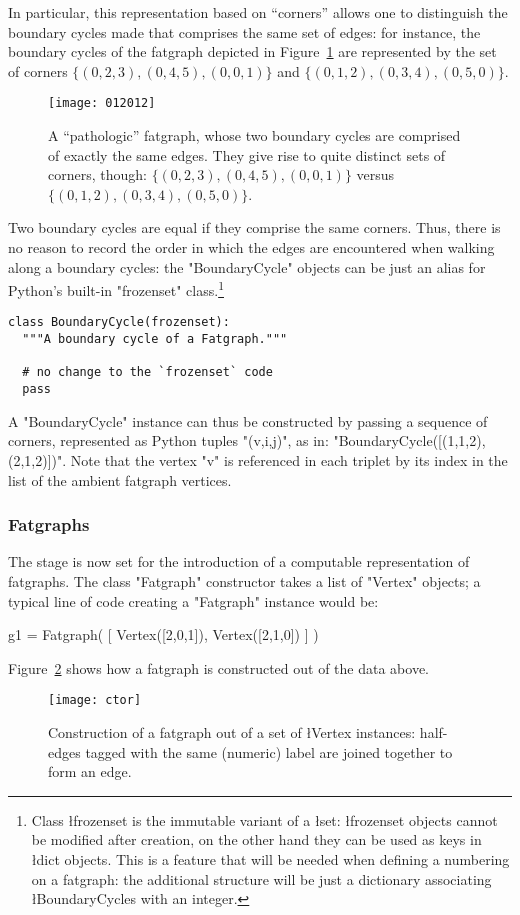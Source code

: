 In particular, this representation based on ``corners'' allows one to
distinguish the boundary cycles made that comprises the same set of
edges: for instance, the boundary cycles of the fatgraph depicted in
Figure~\ref{fig:012012} are represented by the set of corners $\{(0, 2, 3),
(0, 4, 5), (0, 0, 1)\}$ and $\{(0, 1, 2), (0, 3, 4), (0, 5, 0)\}$.
\begin{figure}
  \centering
  \texttt{[image: 012012]}
  \caption{A ``pathologic'' fatgraph, whose two boundary cycles are
    comprised of exactly the same edges. They give rise to quite
    distinct sets of corners, though: $\{(0, 2, 3), (0, 4, 5), (0, 0,
    1)\}$ versus $\{(0, 1, 2), (0, 3, 4), (0, 5, 0)\}$.}
  \label{fig:012012}
\end{figure}

Two boundary cycles are equal if they comprise the same corners.
Thus, there is no reason to record the order in which the edges are
encountered when walking along a boundary cycles: the "BoundaryCycle"
objects can be just an alias for Python's built-in "frozenset"
class.\footnote{Class \l{frozenset} is the immutable variant of a
  \l{set}: \l{frozenset} objects cannot be modified after creation, on
  the other hand they can be used as keys in \l{dict} objects.  This
  is a feature that will be needed when defining a numbering on a
  fatgraph: the additional structure will be just a dictionary
  associating \l{BoundaryCycles} with an integer.}
\begin{lstlisting}
class BoundaryCycle(frozenset):
  """A boundary cycle of a Fatgraph."""

  # no change to the `frozenset` code
  pass 

\end{lstlisting}
A "BoundaryCycle" instance can thus be constructed by passing a
sequence of corners, represented as Python tuples "(v,i,j)", as in:
"BoundaryCycle([(1,1,2), (2,1,2)])".  Note that the vertex "v" is
referenced in each triplet by its index in the list of the ambient
fatgraph vertices.


\subsubsection{Fatgraphs}
\label{sec:fatgraphs}

The stage is now set for the introduction of a computable
representation of fatgraphs.  The class "Fatgraph" constructor takes a
list of "Vertex" objects; a typical line of code creating a "Fatgraph"
instance would be:
\begin{codexmp}
  g1 = Fatgraph( [ Vertex([2,0,1]), 
                   Vertex([2,1,0]) ] )
\end{codexmp}
Figure~\ref{fig:ctor} shows how a fatgraph is constructed out of the
data above.
\begin{figure}
  \centering
  \texttt{[image: ctor]}
  \caption{Construction of a fatgraph out of a set of
    \l{Vertex} instances: half-edges tagged with the same
    (numeric) label are joined together to form an edge.}
  \label{fig:ctor}
\end{figure}

